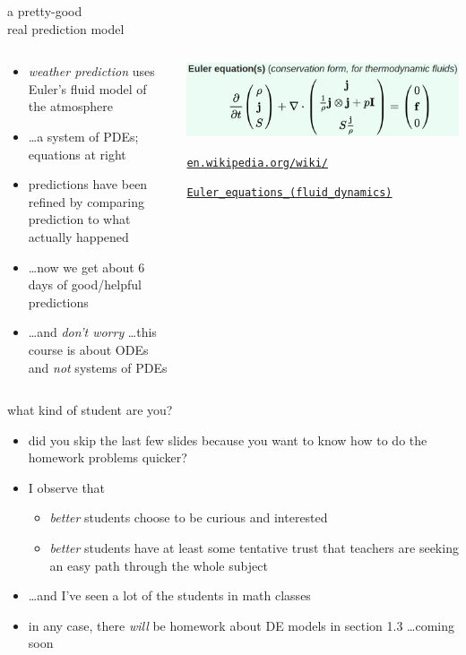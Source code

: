 \documentclass{beamer}
\begin{document}
\begin{frame}{a pretty-good \\ real prediction model}

\begin{columns}
\begin{column}{0.5\textwidth}
\begin{itemize}
\item \emph{weather prediction} uses Euler's fluid model of the atmosphere
\item \dots a system of PDEs; equations at right
\item predictions have been refined by comparing prediction to what actually happened
\item \dots now we get about 6 days of good/helpful predictions
\item \small \dots and \emph{don't worry} \dots this course is about ODEs and \emph{not} systems of PDEs
\end{itemize}
\end{column}
\begin{column}{0.5\textwidth}
\includegraphics[width=\textwidth]{figs/euler-equations}

\medskip

\quad \tiny \href{https://en.wikipedia.org/wiki/Euler_equations_(fluid_dynamics)}{\texttt{en.wikipedia.org/wiki/}}

\qquad \href{https://en.wikipedia.org/wiki/Euler_equations_(fluid_dynamics)}{\texttt{Euler\_equations\_(fluid\_dynamics)}}
\end{column}
\end{columns}
\end{frame}


\begin{frame}{what kind of student are you?}

\begin{itemize}
\item did you skip the last few slides because you want to know how to do the homework problems quicker?
\item I observe that
    \begin{itemize}
    \item \emph{better} students choose to be curious and interested
    \item \emph{better} students have at least some tentative trust that teachers are seeking an easy path through the whole subject
    \end{itemize}
\item \dots and I've seen a lot of the students in math classes

\bigskip
\item in any case, there \emph{will} be homework about DE models in section 1.3 \dots coming soon
\end{itemize}
\end{frame}
\end{document}
